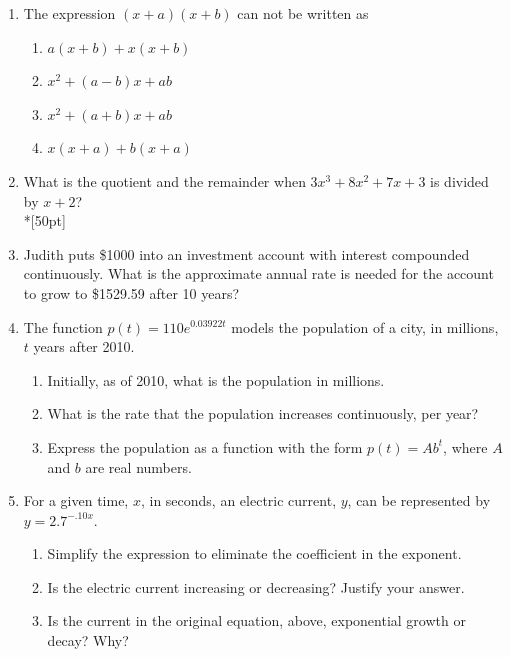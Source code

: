 \documentclass[12pt, oneside]{article}
\begin{document}
\begin{enumerate}
\newpage
\item The expression $(x + a)(x + b)$ can not be written as
\begin{enumerate}
    \item $a(x + b)+ x(x + b)$
    \item $x^2 + (a - b)x + ab$ 
    \item  $x^2 + (a + b)x + ab$  
    \item $x(x + a)+ b(x + a)$
\end{enumerate}

\item What is the quotient and the remainder when $3x^3+8x^2+7x+3$ is divided by $x+2$?\\*[50pt]

\newpage
\item Judith puts \$1000 into an investment account with interest compounded continuously. What is the approximate annual rate is needed for the account to grow to \$1529.59 after 10 years?

\item The function $p(t)=110e^{0.03922t}$ models the population of a city, in millions, $t$ years after 2010.
\begin{enumerate}
    \item Initially, as of 2010, what is the population in millions.\\[40pt]
    \item What is the rate that the population increases continuously, per year?\\[40pt]
    \item Express the population as a function with the form $p(t)=Ab^{t}$, where $A$ and $b$ are real numbers.\\[40pt]
\end{enumerate}

\item For a given time, $x$, in seconds, an electric current, $y$, can be represented by $y = 2.7^{-.10x}$. 
\begin{enumerate}
    \item Simplify the expression to eliminate the coefficient in the exponent.\\[40pt]
    \item Is the electric current increasing or decreasing? Justify your answer.\\[70pt]
    \item Is the current in the original equation, above, exponential growth or decay? Why?\\[70pt]
\end{enumerate}


\end{enumerate}
\end{document}
